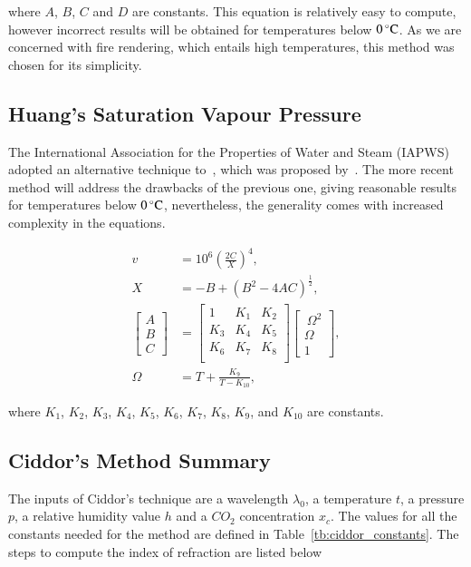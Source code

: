 where $A$, $B$, $C$ and $D$ are constants.
This equation is relatively easy to compute, however incorrect results will be obtained for temperatures below $0\,^{\circ}{\rm C}$.
As we are concerned with fire rendering, which entails high temperatures, this method was chosen for its simplicity.

\subsection{Huang's Saturation Vapour Pressure}
\label{subsec:huang_v}

The International Association for the Properties of Water and Steam (IAPWS) adopted an alternative technique to~\cite{Davis:1992}, which was proposed by~\cite{Huang:1998}.
The more recent method will address the drawbacks of the previous one, giving reasonable results for temperatures below $0\,^{\circ}{\rm C}$, nevertheless, the generality comes with increased complexity in the equations.

\begin{align}
\label{eq:huang_v}
v &= 10^{6} \left( \frac{2C}{X} \right)^4, \\
X &= -B + \left( B^2 - 4AC \right)^{\frac{1}{2}}, \\
\begin{bmatrix}
A \\
B \\
C
\end{bmatrix} &=
\begin{bmatrix}
1 & K_1 & K_2 \\
K_3 & K_4 & K_5 \\
K_6 & K_7 & K_8 \\
\end{bmatrix} 
\begin{bmatrix}
~\Omega^2 \\
\Omega \\
1
\end{bmatrix}, \\
\Omega &= T + \frac{K_9}{T - K_{10}},
\end{align}

where $K_1$, $K_2$, $K_3$, $K_4$, $K_5$, $K_6$, $K_7$, $K_8$, $K_9$, and $K_{10}$ are constants.

\subsection{Ciddor's Method Summary}

The inputs of Ciddor's technique are a wavelength $\lambda_0$, a temperature $t$, a pressure $p$, a relative humidity value $h$ and a $CO_2$ concentration $x_c$.
The values for all the constants needed for the method are defined in Table~\ref{tb:ciddor_constants}.
The steps to compute the index of refraction are listed below

